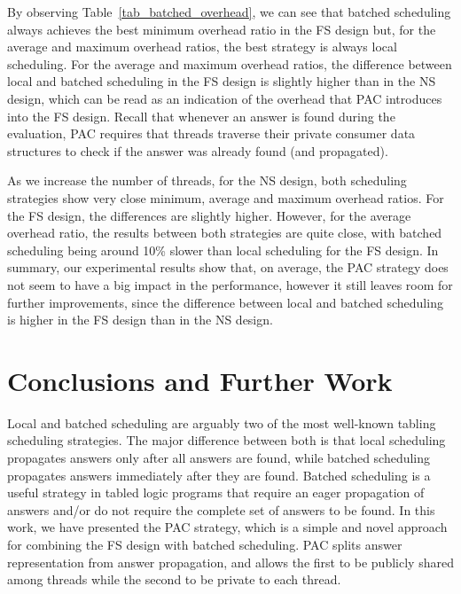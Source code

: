 \documentclass{llncs}
\begin{document}
By observing Table~\ref{tab_batched_overhead}, we can see that batched
scheduling always achieves the best minimum overhead ratio in the FS
design but, for the average and maximum overhead ratios, the best
strategy is always local scheduling. For the average and maximum
overhead ratios, the difference between local and batched scheduling
in the FS design is slightly higher than in the NS design, which can
be read as an indication of the overhead that PAC introduces into the
FS design. Recall that whenever an answer is found during the
evaluation, PAC requires that threads traverse their private consumer
data structures to check if the answer was already found (and propagated).

As we increase the number of threads, for the NS design, both
scheduling strategies show very close minimum, average and maximum
overhead ratios. For the FS design, the differences are slightly
higher. However, for the average overhead ratio, the results between
both strategies are quite close, with batched scheduling being around
10\% slower than local scheduling for the FS design. In summary, our
experimental results show that, on average, the PAC strategy does not
seem to have a big impact in the performance, however it still leaves
room for further improvements, since the difference between local and
batched scheduling is higher in the FS design than in the NS design.


\section{Conclusions and Further Work}

Local and batched scheduling are arguably two of the most well-known
tabling scheduling strategies. The major difference between both is
that local scheduling propagates answers only after all answers are
found, while batched scheduling propagates answers immediately after
they are found. Batched scheduling is a useful strategy in tabled
logic programs that require an eager propagation of answers and/or do
not require the complete set of answers to be found. In this work, we
have presented the PAC strategy, which is a simple and novel approach
for combining the FS design with batched scheduling. PAC splits answer
representation from answer propagation, and allows the first to be
publicly shared among threads while the second to be private to each
thread.
\end{document}
